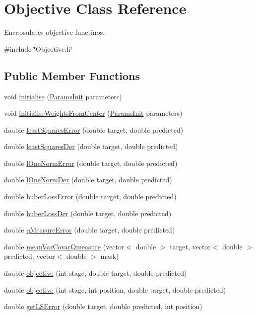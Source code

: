 \hypertarget{classObjective}{}\section{Objective Class Reference}
\label{classObjective}


Encapsulates objective functinos.  




{\ttfamily \#include \char`\"{}Objective.\+h\char`\"{}}

\subsection*{Public Member Functions}
\begin{DoxyCompactItemize}
\item 
void \hyperlink{classObjective_a2241206a261b91770ff4f58385becf57}{initialise} (\hyperlink{classParamsInit}{Params\+Init} parameters)
\item 
void \hyperlink{classObjective_a0b06d92b076ffff26af8c5918da736ee}{initialise\+Weights\+From\+Center} (\hyperlink{classParamsInit}{Params\+Init} parameters)
\item 
double \hyperlink{classObjective_a8746cd7f37fc8a0ce8a31b51a51823b5}{least\+Squares\+Error} (double target, double predicted)
\item 
double \hyperlink{classObjective_ab966b25d12083a76d11ac3f6e5c711ef}{least\+Squares\+Der} (double target, double predicted)
\item 
double \hyperlink{classObjective_aac52d1f8fd934f996c4bf533170b23bf}{l\+One\+Norm\+Error} (double target, double predicted)
\item 
double \hyperlink{classObjective_a6c7dc399840df1c856f20b10a5a1569d}{l\+One\+Norm\+Der} (double target, double predicted)
\item 
double \hyperlink{classObjective_a30db6b8fbe36af5088d34f2541ec28e5}{huber\+Loss\+Error} (double target, double predicted)
\item 
double \hyperlink{classObjective_af43f0162ad03be85f91a3502904b58ae}{huber\+Loss\+Der} (double target, double predicted)
\item 
double \hyperlink{classObjective_ad1f68e7b56fcc12766769c420b7efffa}{q\+Measure\+Error} (double target, double predicted)
\item 
double \hyperlink{classObjective_af54bf7846f506e37dd0113efc261e13a}{mean\+Var\+Covar\+Qmeasure} (vector$<$ double $>$ target, vector$<$ double $>$ predicted, vector$<$ double $>$ mask)
\item 
double \hyperlink{classObjective_a83f3cc1fe6d1fefe00b06eb5d27b4e6e}{objective} (int stage, double target, double predicted)
\item 
double \hyperlink{classObjective_a9f011366c3a1401e11afed8e9620bcb0}{objective} (int stage, int position, double target, double predicted)
\item 
double \hyperlink{classObjective_a91b745efca74c55eb1415bdc101c0c8c}{get\+L\+S\+Error} (double target, double predicted, int position)
\end{DoxyCompactItemize}
